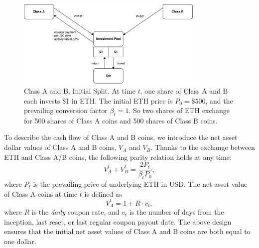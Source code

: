 \documentclass[11pt]{article}%
\numberwithin{equation}{section}
\theoremstyle{plain}
\begin{document}
\begin{figure}[!htb]
	\centering
	\includegraphics[width=0.8\textwidth]{initial}
	\caption{Class A and B, Initial Split. At time $t$, one share of Class A and B each invests \$1 in ETH. The initial ETH price is $P_0=\$500$, and the prevailing conversion factor $\beta_t=1$. So two shares of ETH exchange for 500 shares of Class A coins and 500 shares of Class B coins.}\label{fig:initial}
\end{figure}

To describe the cash flow of Class A and B coins, we introduce the net asset dollar values of Class A and B coins, $V_A$ and $V_B$. Thanks to the exchange between ETH and Class A/B coins, the following parity relation holds at any time:
\begin{equation}
\label{parity}
V_{A}^{t}+V_{B}^{t}=\frac{2P_{t}}{\beta_tP_{0}},
\end{equation}
where $P_t$ is the prevailing price of underlying ETH in USD.
The net asset value of Class A coins at time $t$ is defined as
\begin{equation}
V_{A}^{t}= 1+R\cdot v_t, \label{eq:netvalue}
\end{equation}
where $R$ is the \emph{daily} coupon rate, and $v_t$ is the number of days from the inception, last reset, or last regular coupon payout date. The above design ensures that the initial net asset values of Class A and B coins are both equal to one dollar.
\end{document}
